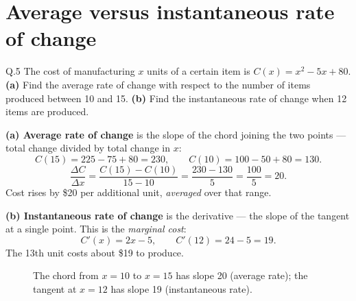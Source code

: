 \section{Average versus instantaneous rate of change}

\begin{question}{Q.5}
The cost of manufacturing $x$ units of a certain item is
$C(x)=x^{2}-5x+80$.
\textbf{(a)} Find the average rate of change with respect to the number of
items produced between 10 and 15.
\textbf{(b)} Find the instantaneous rate of change when 12 items are produced.
\end{question}

\begin{solution}
\textbf{(a) Average rate of change} is the slope of the chord joining the two
points --- total change divided by total change in $x$:
\[
C(15)=225-75+80=230,\qquad C(10)=100-50+80=130 .
\]
\[
\frac{\Delta C}{\Delta x}=\frac{C(15)-C(10)}{15-10}=\frac{230-130}{5}
=\frac{100}{5}=20 .
\]
Cost rises by \$20 per additional unit, \emph{averaged} over that range.

\medskip
\textbf{(b) Instantaneous rate of change} is the derivative --- the slope of
the tangent at a single point. This is the \emph{marginal cost}:
\[
C'(x)=2x-5, \qquad C'(12)=24-5=19 .
\]
The 13th unit costs about \$19 to produce.

\begin{figure}[H]
\centering
{}
\caption{The chord from $x=10$ to $x=15$ has slope 20 (average rate); the
tangent at $x=12$ has slope 19 (instantaneous rate).}
\end{figure}

\end{solution}

